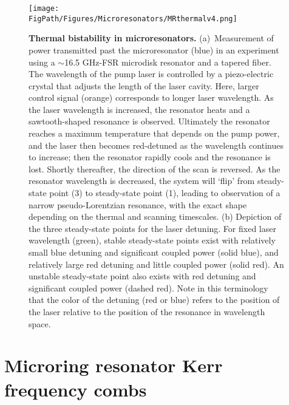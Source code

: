 \begin{figure}[htpb]
	\begin{center}
		\texttt{[image: \\FigPath/Figures/Microresonators/MRthermalv4.png]}
	\end{center}
	\caption[Thermal bistability in microresonators]{\textbf{Thermal bistability in microresonators.} (a)~Measurement of power transmitted past the microresonator (blue) in an experiment using a $\sim$16.5 GHz-FSR microdisk resonator and a tapered fiber. The wavelength of the pump laser is controlled by a piezo-electric crystal that adjusts the length of the laser cavity. Here, larger control signal (orange) corresponds to longer laser wavelength. As the laser wavelength is increased, the resonator heats and a sawtooth-shaped resonance is observed. Ultimately the resonator reaches a maximum temperature that depends on the pump power, and the laser then becomes red-detuned as the wavelength continues to increase; then the resonator rapidly cools and the resonance is lost. Shortly thereafter, the direction of the scan is reversed. As the resonator wavelength is decreased, the system will `flip' from steady-state point (3) to steady-state point (1), leading to observation of a narrow pseudo-Lorentzian resonance, with the exact shape depending on the thermal and scanning timescales. (b) Depiction of the three steady-state points for the laser detuning. For fixed laser wavelength (green), stable steady-state points exist with relatively small blue detuning and significant coupled power (solid blue), and relatively large red detuning and little coupled power (solid red). An unstable steady-state point also exists with red detuning and significant coupled power (dashed red). Note in this terminology that the color of the detuning (red or blue) refers to the position of the laser relative to the position of the resonance in wavelength space. }
	
	\label{fig:MRthermal}
\end{figure} 








\section{Microring resonator Kerr frequency combs}

